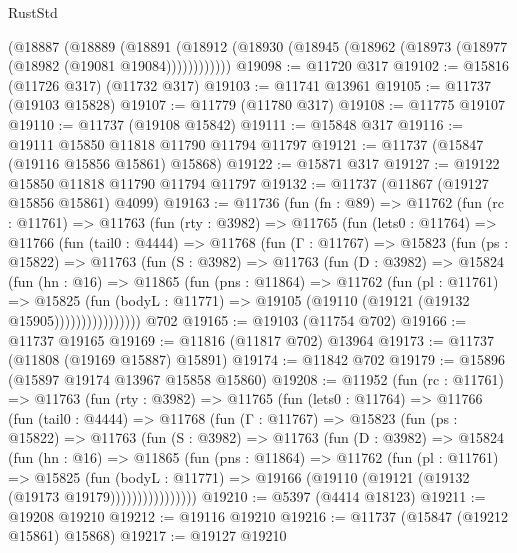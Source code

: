 \begin{lexlean}{RustStd}
\begin{coremodule}
      (@18887
        (@18889
          (@18891 (@18912 (@18930 (@18945 (@18962 (@18973 (@18977 (@18982 (@19081 @19084))))))))))))
@19098 := @11720 @317
@19102 := @15816 (@11726 @317) (@11732 @317)
@19103 := @11741 @13961
@19105 := @11737 (@19103 @15828)
@19107 := @11779 (@11780 @317)
@19108 := @11775 @19107
@19110 := @11737 (@19108 @15842)
@19111 := @15848 @317
@19116 := @19111 @15850 @11818 @11790 @11794 @11797
@19121 := @11737 (@15847 (@19116 @15856 @15861) @15868)
@19122 := @15871 @317
@19127 := @19122 @15850 @11818 @11790 @11794 @11797
@19132 := @11737 (@11867 (@19127 @15856 @15861) @4099)
@19163 := @11736
    (fun (fn : @89) =>
    @11762
      (fun (rc : @11761) =>
      @11763
        (fun (rty : @3982) =>
        @11765
          (fun (lets0 : @11764) =>
          @11766
            (fun (tail0 : @4444) =>
            @11768
              (fun (Γ : @11767) =>
              @15823
                (fun (ps : @15822) =>
                @11763
                  (fun (S : @3982) =>
                  @11763
                    (fun (D : @3982) =>
                    @15824
                      (fun (hn : @16) =>
                      @11865
                        (fun (pns : @11864) =>
                        @11762
                          (fun (pl : @11761) =>
                          @15825
                            (fun (bodyL : @11771) =>
                            @19105 (@19110 (@19121 (@19132 @15905))))))))))))))))
    @702
@19165 := @19103 (@11754 @702)
@19166 := @11737 @19165
@19169 := @11816 (@11817 @702) @13964
@19173 := @11737 (@11808 (@19169 @15887) @15891)
@19174 := @11842 @702
@19179 := @15896 (@15897 @19174 @13967 @15858 @15860)
@19208 := @11952
    (fun (rc : @11761) =>
    @11763
      (fun (rty : @3982) =>
      @11765
        (fun (lets0 : @11764) =>
        @11766
          (fun (tail0 : @4444) =>
          @11768
            (fun (Γ : @11767) =>
            @15823
              (fun (ps : @15822) =>
              @11763
                (fun (S : @3982) =>
                @11763
                  (fun (D : @3982) =>
                  @15824
                    (fun (hn : @16) =>
                    @11865
                      (fun (pns : @11864) =>
                      @11762
                        (fun (pl : @11761) =>
                        @15825
                          (fun (bodyL : @11771) =>
                          @19166 (@19110 (@19121 (@19132 (@19173 @19179))))))))))))))))
@19210 := @5397 (@4414 @18123)
@19211 := @19208 @19210
@19212 := @19116 @19210
@19216 := @11737 (@15847 (@19212 @15861) @15868)
@19217 := @19127 @19210

\end{coremodule}
\end{lexlean}
